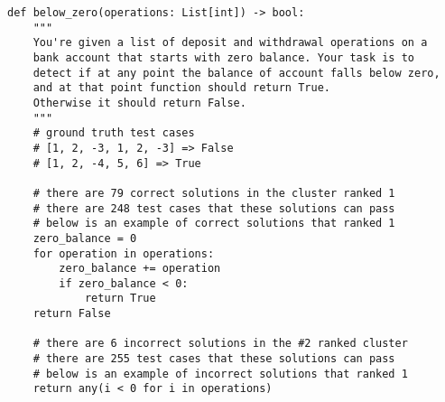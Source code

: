 \begin{lstlisting}[style=mypython, caption={Effectiveness of \ours}, label={lst:positive_code_2}, basicstyle=\tiny]
def below_zero(operations: List[int]) -> bool:
    """
    You're given a list of deposit and withdrawal operations on a
    bank account that starts with zero balance. Your task is to
    detect if at any point the balance of account falls below zero, 
    and at that point function should return True. 
    Otherwise it should return False.
    """
    # ground truth test cases
    # [1, 2, -3, 1, 2, -3] => False
    # [1, 2, -4, 5, 6] => True
    
    # there are 79 correct solutions in the cluster ranked 1
    # there are 248 test cases that these solutions can pass
    # below is an example of correct solutions that ranked 1
    zero_balance = 0
    for operation in operations:
        zero_balance += operation
        if zero_balance < 0:
            return True
    return False
    
    # there are 6 incorrect solutions in the #2 ranked cluster
    # there are 255 test cases that these solutions can pass
    # below is an example of incorrect solutions that ranked 1
    return any(i < 0 for i in operations)
\end{lstlisting}
\fi



